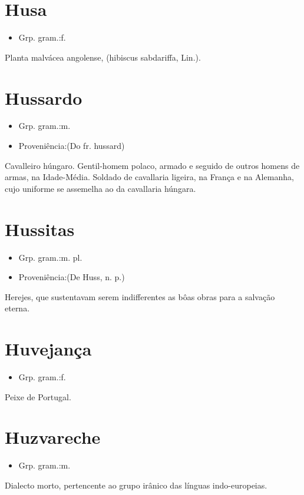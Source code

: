 \documentclass{article}
\begin{document}
\section{Husa}
\begin{itemize}
\item {Grp. gram.:f.}
\end{itemize}
Planta malvácea angolense, (\textunderscore hibiscus sabdariffa\textunderscore , Lin.).
\section{Hussardo}
\begin{itemize}
\item {Grp. gram.:m.}
\end{itemize}
\begin{itemize}
\item {Proveniência:(Do fr. \textunderscore hussard\textunderscore )}
\end{itemize}
Cavalleiro húngaro.
Gentil-homem polaco, armado e seguido de outros homens de armas, na Idade-Média.
Soldado de cavallaria ligeira, na França e na Alemanha, cujo uniforme se assemelha ao da cavallaria húngara.
\section{Hussitas}
\begin{itemize}
\item {Grp. gram.:m. pl.}
\end{itemize}
\begin{itemize}
\item {Proveniência:(De \textunderscore Huss\textunderscore , n. p.)}
\end{itemize}
Herejes, que sustentavam serem indifferentes as bôas obras para a salvação eterna.
\section{Huvejança}
\begin{itemize}
\item {Grp. gram.:f.}
\end{itemize}
Peixe de Portugal.
\section{Huzvareche}
\begin{itemize}
\item {Grp. gram.:m.}
\end{itemize}
Dialecto morto, pertencente ao grupo irânico das línguas indo-europeias.
\end{document}
